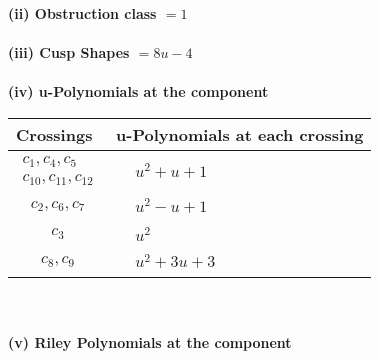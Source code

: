 \documentclass[1p]{elsarticle_modified}
\theoremstyle{definition}
\begin{document}
\flushleft \textbf{(ii) Obstruction class $= 1$}\\~\\
\flushleft \textbf{(iii) Cusp Shapes $= 8 u-4$}\\~\\
\newpage\renewcommand{\arraystretch}{1}
\flushleft \textbf{(iv) u-Polynomials at the component}\newline \\
\begin{tabular}{m{50pt}|m{274pt}}
Crossings & \hspace{64pt}u-Polynomials at each crossing \\
\hline $$\begin{aligned}c_{1},c_{4},c_{5}\\c_{10},c_{11},c_{12}\end{aligned}$$&$\begin{aligned}
&u^2+u+1
\end{aligned}$\\
\hline $$\begin{aligned}c_{2},c_{6},c_{7}\end{aligned}$$&$\begin{aligned}
&u^2- u+1
\end{aligned}$\\
\hline $$\begin{aligned}c_{3}\end{aligned}$$&$\begin{aligned}
&u^2
\end{aligned}$\\
\hline $$\begin{aligned}c_{8},c_{9}\end{aligned}$$&$\begin{aligned}
&u^2+3 u+3
\end{aligned}$\\
\hline
\end{tabular}\\~\\
\newpage\renewcommand{\arraystretch}{1}
\flushleft \textbf{(v) Riley Polynomials at the component}\newline \\
\end{document}
